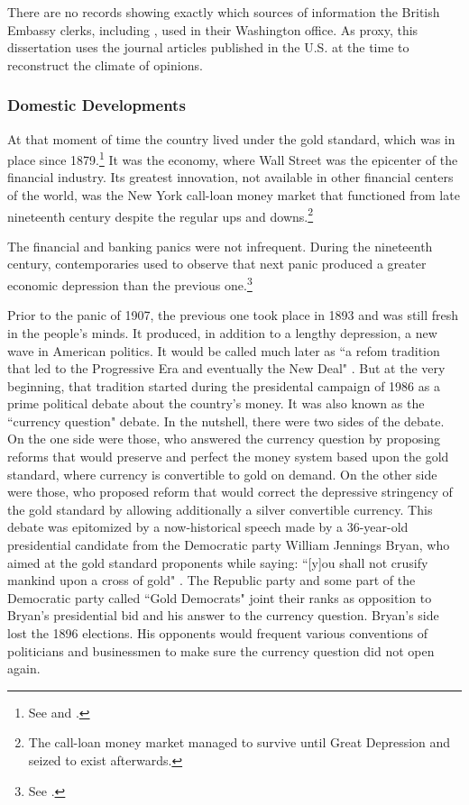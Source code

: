 There are no records showing exactly which sources of information the British Embassy clerks, including \citeauthor{innes1913}, used in their Washington office. As proxy, this dissertation uses the journal articles published in the U.S. at the time to reconstruct the climate of opinions.

\subsubsection*{Domestic Developments}

At that moment of time the country lived under the gold standard, which was in place since 1879.\footnote{See \citep[p.~18]{eichengreen2008} and \citep[p.~6]{woodward2011}.} It was the economy, where Wall Street was the epicenter of the financial industry. Its greatest innovation, not available in other financial centers of the world, was the New York call-loan money market that functioned from late nineteenth century despite the regular ups and downs.\footnote{The call-loan money market managed to survive until Great Depression and seized to exist afterwards.}

The financial and banking panics were not infrequent. During the nineteenth century, contemporaries used to observe that next panic produced a greater economic depression than the previous one.\footnote{See \cite{richardson2015}.} 

Prior to the panic of 1907, the previous one took place in 1893 and was still fresh in the people's minds. It produced, in addition to a lengthy depression, a new wave in American politics. It would be called much later as ``a refom tradition that led to the Progressive Era and eventually the New Deal" \citep[p.~30]{unterman2017}. But at the very beginning, that tradition started during the presidental campaign of 1986 as a prime political debate about the country's money. It was also known as the ``currency question" debate. In the nutshell, there were two sides of the debate. On the one side were those, who answered the currency question by proposing reforms that would preserve and perfect the money system based upon the gold standard, where currency is convertible to gold on demand. On the other side were those, who proposed reform that would correct the depressive stringency of the gold standard by allowing additionally a silver convertible currency. This debate was epitomized by a now-historical speech made by a 36-year-old presidential candidate from the Democratic party William Jennings Bryan, who aimed at the gold standard proponents while saying: ``[y]ou shall not crusify mankind upon a cross of gold" \citep[p.~28]{unterman2017}. The Republic party and some part of the Democratic party called ``Gold Democrats" joint their ranks as opposition to Bryan's presidential bid and his answer to the currency question. Bryan's side lost the 1896 elections. His opponents would frequent various conventions of politicians and businessmen to make sure the currency question did not open again.

